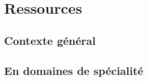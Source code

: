 \section{Ressources}
  \subsection{Contexte général}
    

  \subsection{En domaines de spécialité}
    

